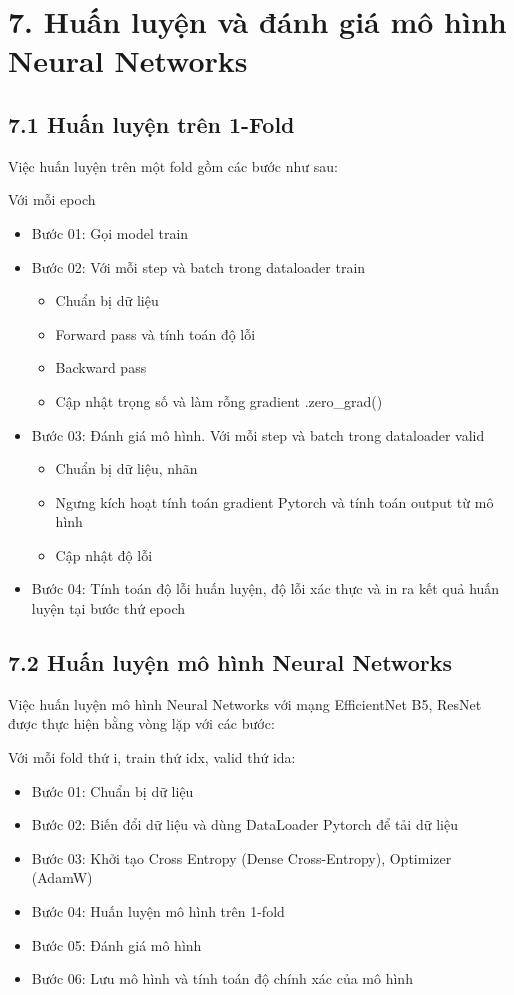 \documentclass{article}
\begin{document}
	\section{7. Huấn luyện và đánh giá mô hình Neural Networks}
	\subsection{7.1 Huấn luyện trên 1-Fold}
	Việc huấn luyện trên một fold gồm các bước như sau:
		
	Với mỗi epoch
	\begin{itemize}
		\item Bước 01: Gọi model train
		\item Bước 02: Với mỗi step và batch trong dataloader train
		\begin{itemize}
			\item Chuẩn bị dữ liệu
			\item Forward pass và tính toán độ lỗi
			\item Backward pass
			\item Cập nhật trọng số và làm rỗng gradient .zero\_grad()
		\end{itemize}
		\item Bước 03: Đánh giá mô hình.  Với mỗi step và batch trong dataloader valid
		\begin{itemize}
			\item Chuẩn bị dữ liệu, nhãn
			\item Ngưng kích hoạt tính toán gradient Pytorch và tính toán output từ mô hình
			\item Cập nhật độ lỗi
		\end{itemize}
		\item Bước 04: Tính toán độ lỗi huấn luyện, độ lỗi xác thực và in ra kết quả huấn luyện tại bước thứ epoch
	\end{itemize}
	
	\subsection{7.2 Huấn luyện mô hình Neural Networks}
	Việc huấn luyện mô hình Neural Networks với mạng EfficientNet B5, ResNet được thực hiện bằng vòng lặp với các bước:
	
	Với mỗi fold thứ i, train thứ idx, valid thứ ida:
	\begin{itemize}
		\item Bước 01: Chuẩn bị dữ liệu
		\item Bước 02: Biến đổi dữ liệu và dùng DataLoader Pytorch để tải dữ liệu
		\item Bước 03: Khởi tạo Cross Entropy (Dense Cross-Entropy), Optimizer (AdamW)
		\item Bước 04: Huấn luyện mô hình trên 1-fold
		\item Bước 05: Đánh giá mô hình
		\item Bước 06: Lưu mô hình và tính toán độ chính xác của mô hình
	\end{itemize}
\end{document}
